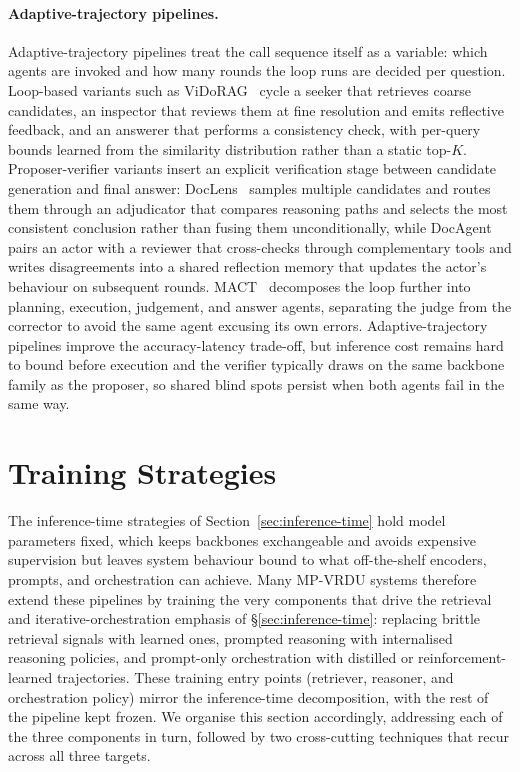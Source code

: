 \documentclass[11pt]{article}
\begin{document}
\paragraph{Adaptive-trajectory pipelines.} Adaptive-trajectory pipelines treat the call sequence itself as a variable: which agents are invoked and how many rounds the loop runs are decided per question. Loop-based variants such as ViDoRAG~\cite{wang2025vidorag} cycle a seeker that retrieves coarse candidates, an inspector that reviews them at fine resolution and emits reflective feedback, and an answerer that performs a consistency check, with per-query bounds learned from the similarity distribution rather than a static top-$K$. Proposer-verifier variants insert an explicit verification stage between candidate generation and final answer: DocLens~\cite{zhu2025doclens} samples multiple candidates and routes them through an adjudicator that compares reasoning paths and selects the most consistent conclusion rather than fusing them unconditionally, while DocAgent~\cite{sun2025docagent} pairs an actor with a reviewer that cross-checks through complementary tools and writes disagreements into a shared reflection memory that updates the actor's behaviour on subsequent rounds. MACT~\cite{yu2025mact} decomposes the loop further into planning, execution, judgement, and answer agents, separating the judge from the corrector to avoid the same agent excusing its own errors. Adaptive-trajectory pipelines improve the accuracy-latency trade-off, but inference cost remains hard to bound before execution and the verifier typically draws on the same backbone family as the proposer, so shared blind spots persist when both agents fail in the same way.

\section{Training Strategies}
\label{sec:training}

The inference-time strategies of Section~\ref{sec:inference-time} hold model parameters fixed, which keeps backbones exchangeable and avoids expensive supervision but leaves system behaviour bound to what off-the-shelf encoders, prompts, and orchestration can achieve. Many MP-VRDU systems therefore extend these pipelines by training the very components that drive the retrieval and iterative-orchestration emphasis of \S\ref{sec:inference-time}: replacing brittle retrieval signals with learned ones, prompted reasoning with internalised reasoning policies, and prompt-only orchestration with distilled or reinforcement-learned trajectories. These training entry points (retriever, reasoner, and orchestration policy) mirror the inference-time decomposition, with the rest of the pipeline kept frozen. We organise this section accordingly, addressing each of the three components in turn, followed by two cross-cutting techniques that recur across all three targets.
\end{document}
